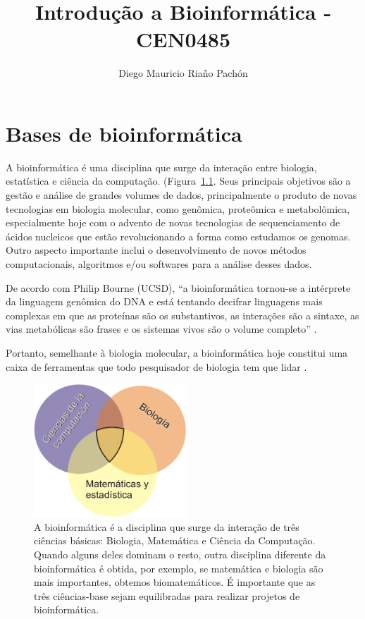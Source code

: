 \documentclass[letter,11pt]{book}
\author{Diego Mauricio Ria\~{n}o Pach\'{o}n}
\title{Introdução a Bioinformática - CEN0485}
\begin{document}
\maketitle
\tableofcontents
\listoffigures

\chapter{Bases de bioinformática}


A bioinformática é uma disciplina que surge da interação entre biologia, estatística e ciência da computação. (Figura~\ref{bioinf}. Seus principais objetivos são a gestão e análise de grandes volumes de dados, principalmente o produto de novas tecnologias em biologia molecular, como genômica, proteômica e metabolômica, especialmente hoje com o advento de novas tecnologias de sequenciamento de ácidos nucleicos que estão revolucionando a forma como estudamos os genomas. Outro aspecto importante inclui o desenvolvimento de novos métodos computacionais, algoritmos e/ou softwares para a análise desses dados. 

De acordo com Philip Bourne (UCSD), ``a bioinformática tornou-se a intérprete da linguagem genômica do DNA e está tentando decifrar linguagens mais complexas em que as proteínas são os substantivos, as interações são a sintaxe, as vias metabólicas são frases e os sistemas vivos são o volume completo'' \citep{Bourne2004}.

Portanto, semelhante à biologia molecular, a bioinformática hoje constitui uma caixa de ferramentas que todo pesquisador de biologia tem que lidar \citetext{\citealp{Stein2008} apresenta um ponto de vista muito interessante}.

\begin{figure}[h]
\centering
   \includegraphics[height=5cm]{Figs/Bioinformatica.png}
  \caption[O que é bioinformática?]{\label{bioinf} A bioinformática é a disciplina que surge da interação de três ciências básicas: Biologia, Matemática e Ciência da Computação. Quando alguns deles dominam o resto, outra disciplina diferente da bioinformática é obtida, por exemplo, se matemática e biologia são mais importantes, obtemos biomatemáticos. É importante que as três ciências-base sejam equilibradas para realizar projetos de bioinformática.}
\end{figure}
\end{document}
